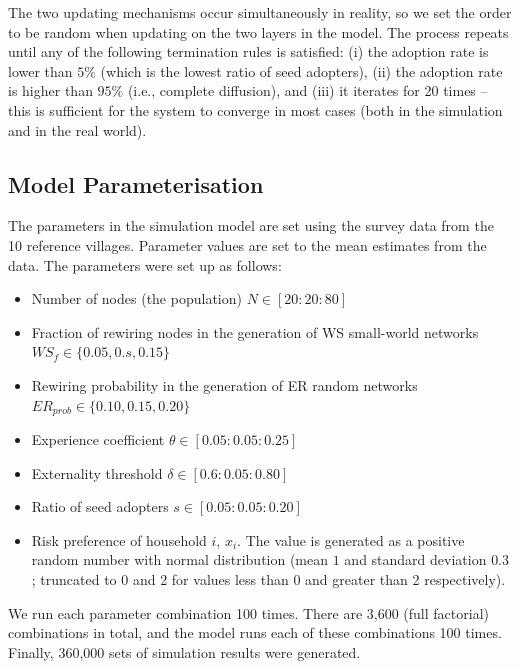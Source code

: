 \documentclass{bmcart}
\begin{document}
The two updating mechanisms occur simultaneously in reality, so we set the order to be random when updating on the two layers in the model. The process repeats until any of the following termination rules is satisfied: (i) the adoption rate is lower than $5\%$ (which is the lowest ratio of seed adopters), (ii) the adoption rate is higher than $95\%$ (i.e., complete diffusion), and (iii) it iterates for 20 times -- this is sufficient for the system to converge in most cases (both in the simulation and in the real world).

\subsection*{Model Parameterisation}
\label{parameterisation}
The parameters in the simulation model are set using the survey data from the 10 reference villages. Parameter values are set to the mean estimates from the data. The parameters were set up as follows:
\begin{itemize}
\item Number of nodes (the population) $N\in [20 : 20 : 80]$

\item Fraction of rewiring nodes in the generation of WS small-world networks $WS_f\in \{0.05, 0.s, 0.15\}$

\item Rewiring probability in the generation of ER random networks $ER_{prob} \in \{0.10, 0.15, 0.20\}$

\item Experience coefficient $\theta \in [0.05 : 0.05 : 0.25]$

\item Externality threshold $\delta \in [0.6 : 0.05 : 0.80]$ 

\item Ratio of seed adopters $s \in [0.05 : 0.05 : 0.20]$

\item Risk preference of household $i$, $x_i$. The value is generated as a positive random number with normal distribution (mean $1$ and standard deviation $0.3$; truncated to 0 and 2 for values less than 0 and greater than 2 respectively).
\end{itemize}

We run each parameter combination 100 times. There are 3,600 (full factorial) combinations in total, and the model runs each of these combinations 100 times. Finally, 360,000 sets of simulation results were generated.
\end{document}
